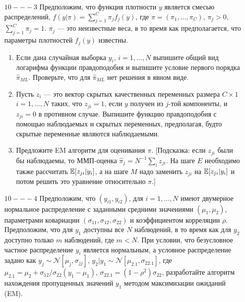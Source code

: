 \begin{enumerate}
\item [$10 --- 3$] Предположим, что функция плотности  $y$ является смесью распределений, $f(y|\pi) = \sum_{j=1}^C \pi_j f_j(y)$, где $\pi = (\pi_1, \dots, \pi_C)$, $\pi_j > 0$, $\sum_{j=1}^C \pi_j = 1$. $\pi_j$ --- это неизвестные веса, в то время как предполагается, что параметры плотностей $f_j(y)$ известны.
\begin{enumerate}
\item Если дана случайная выборка $y_i$, $i = 1, \dots, N$ выпишите общий вид логарифма функции правдоподобия и выпишите условие первого порядка $\hat{\pi}_{ML}$. Проверьте, что для $\hat{\pi}_{ML}$ нет решения в явном виде.
\item Пусть $z_i$ --- это вектор скрытых качественных переменных размера $C \times 1$ $i = 1, \dots, N$ таких, что $z_{ji} = 1$, если $y$ получен из $j$-той компоненты, и $z_{ji} = 0$ в противном случае. Выпишите функцию правдоподобия с помощью наблюдаемых и скрытых переменных, предполагая, будто скрытые переменные являются наблюдаемыми.
\item Предложите EM алгоритм для оценивания $\pi$. [Подсказка: если $z_{ji}$ были бы наблюдаемы, то ММП-оценка $\hat{\pi}_j = N^{-1} \sum_i z_{ji}$. На шаге $E$ необходимо также рассчитать $\mathbb{E}[z_{ji}|y_i]$, а на шаге $M$ надо заменить $z_{ji}$ на $\mathbb{E}[z_{ji}|y_i]$ и потом решить это уравнение относительно $\pi$.]
\end{enumerate}


\item [$10 --- 4$] Предположим, что $(y_{i1}, y_{i2})$, для $i = 1,\dots,N$ имеют двумерное нормальное распределение с заданными средними значениями $(\mu_1, \mu_2)$, параметрами ковариации $(\sigma_{11}, \sigma_{12}, \sigma_{22})$ и коэффициентом корреляции $\rho$. Предположим, что для $y_1$ доступны все $N$ наблюдений, в то время как для $y_2$ доступно только $m$ наблюдений, где $m<N$. При условии, что безусловное частное распределение $y_i$ является нормальным, а условное распределение задано как $y_j \sim \mathcal{N} [\mu_j, \sigma_{jj}]$, $y_2|y_1 \sim \mathcal{N}[\mu_{2.1}, \sigma_{22.1}]$, где $\mu_{2.1}=\mu_2+\sigma_{12}/\sigma_{22}(y_1-\mu_1)$, $\sigma_{22.1}=(1-\rho^2)\sigma_{22}$, разработайте алгоритм нахождения пропущенных значений $y_1$ методом максимизации ожиданий (EM).
\end{enumerate}

